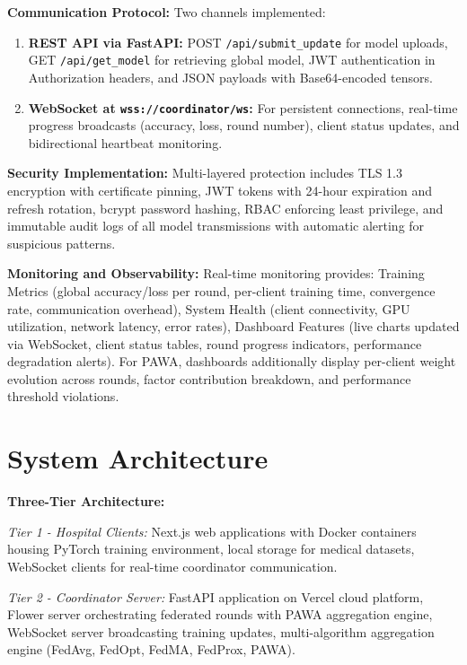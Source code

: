 \textbf{Communication Protocol:} Two channels implemented:
\begin{enumerate}
    \item \textbf{REST API via FastAPI:} POST \texttt{/api/submit\_update} for model uploads, GET \texttt{/api/get\_model} for retrieving global model, JWT authentication in Authorization headers, and JSON payloads with Base64-encoded tensors.
    \item \textbf{WebSocket at \texttt{wss://coordinator/ws}:} For persistent connections, real-time progress broadcasts (accuracy, loss, round number), client status updates, and bidirectional heartbeat monitoring.
\end{enumerate}

\textbf{Security Implementation:} Multi-layered protection includes TLS 1.3 encryption with certificate pinning, JWT tokens with 24-hour expiration and refresh rotation, bcrypt password hashing, RBAC enforcing least privilege, and immutable audit logs of all model transmissions with automatic alerting for suspicious patterns.

\textbf{Monitoring and Observability:} Real-time monitoring provides: Training Metrics (global accuracy/loss per round, per-client training time, convergence rate, communication overhead), System Health (client connectivity, GPU utilization, network latency, error rates), Dashboard Features (live charts updated via WebSocket, client status tables, round progress indicators, performance degradation alerts). For PAWA, dashboards additionally display per-client weight evolution across rounds, factor contribution breakdown, and performance threshold violations.

\section{System Architecture}

\textbf{Three-Tier Architecture:}

\textit{Tier 1 - Hospital Clients:} Next.js web applications with Docker containers housing PyTorch training environment, local storage for medical datasets, WebSocket clients for real-time coordinator communication.

\textit{Tier 2 - Coordinator Server:} FastAPI application on Vercel cloud platform, Flower server orchestrating federated rounds with PAWA aggregation engine, WebSocket server broadcasting training updates, multi-algorithm aggregation engine (FedAvg, FedOpt, FedMA, FedProx, PAWA).


